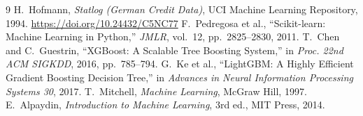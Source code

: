 \documentclass[11pt,a4paper]{article}
\begin{document}
\begin{thebibliography}{9}
 H.~Hofmann, \emph{Statlog (German Credit Data)}, UCI Machine Learning Repository, 1994. \url{https://doi.org/10.24432/C5NC77}
 F.~Pedregosa et al., ``Scikit-learn: Machine Learning in Python,'' \emph{JMLR}, vol.~12, pp.~2825--2830, 2011.
 T.~Chen and C.~Guestrin, ``XGBoost: A Scalable Tree Boosting System,'' in \emph{Proc. 22nd ACM SIGKDD}, 2016, pp.~785--794.
 G.~Ke et al., ``LightGBM: A Highly Efficient Gradient Boosting Decision Tree,'' in \emph{Advances in Neural Information Processing Systems 30}, 2017.
 T.~Mitchell, \emph{Machine Learning}, McGraw Hill, 1997.
 E.~Alpaydin, \emph{Introduction to Machine Learning}, 3rd ed., MIT Press, 2014.
\end{thebibliography}
\end{document}
